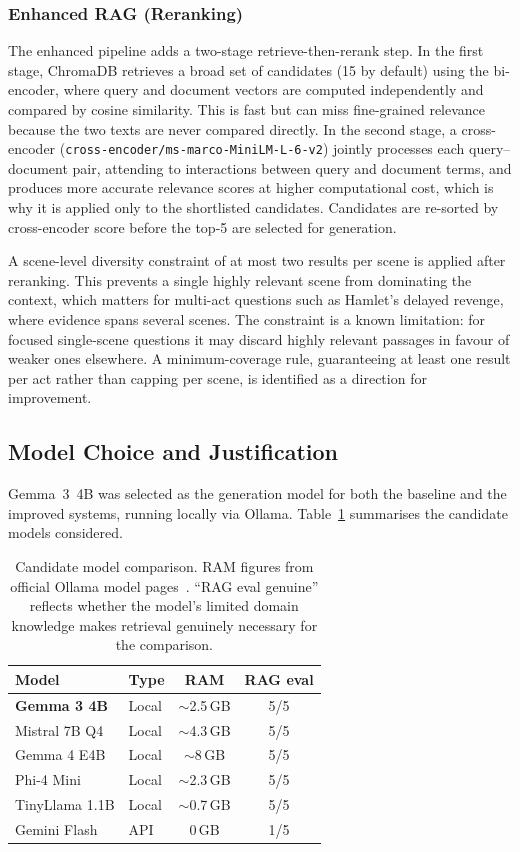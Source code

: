 \subsubsection{Enhanced RAG (Reranking)}
The enhanced pipeline adds a two-stage retrieve-then-rerank step. In the
first stage, ChromaDB retrieves a broad set of candidates (15 by default)
using the bi-encoder, where query and document vectors are computed
independently and compared by cosine similarity. This is fast but can
miss fine-grained relevance because the two texts are never compared
directly. In the second stage, a cross-encoder
(\texttt{cross-encoder/ms-marco-MiniLM-L-6-v2}) jointly processes each
query--document pair, attending to interactions between query and
document terms, and produces more accurate relevance scores at higher
computational cost, which is why it is applied only to the shortlisted
candidates. Candidates are re-sorted by cross-encoder score before the
top-5 are selected for generation.

A scene-level diversity constraint of at most two results per scene is
applied after reranking. This prevents a single highly relevant scene
from dominating the context, which matters for multi-act questions such
as Hamlet's delayed revenge, where evidence spans several scenes. The
constraint is a known limitation: for focused single-scene questions it
may discard highly relevant passages in favour of weaker ones elsewhere.
A minimum-coverage rule, guaranteeing at least one result per act rather
than capping per scene, is identified as a direction for improvement.

\subsection{Model Choice and Justification}
Gemma~3~4B was selected as the generation model for both the baseline and
the improved systems, running locally via Ollama.
Table~\ref{tab:model_comparison} summarises the candidate models
considered.

\begin{table}[ht]
\centering
\caption{Candidate model comparison. RAM figures from official Ollama
model pages~\cite{ollama_gemma3,localaimaster_ram}. ``RAG eval genuine''
reflects whether the model's limited domain knowledge makes retrieval
genuinely necessary for the comparison.}
\label{tab:model_comparison}
\begin{tabular}{llcc}
\toprule
\textbf{Model} & \textbf{Type} & \textbf{RAM} & \textbf{RAG eval} \\
\midrule
\textbf{Gemma 3 4B} & Local & $\sim$2.5\,GB & 5/5 \\
Mistral 7B Q4       & Local & $\sim$4.3\,GB & 5/5 \\
Gemma 4 E4B         & Local & $\sim$8\,GB    & 5/5 \\
Phi-4 Mini          & Local & $\sim$2.3\,GB & 5/5 \\
TinyLlama 1.1B      & Local & $\sim$0.7\,GB & 5/5 \\
Gemini Flash        & API   & 0\,GB         & 1/5 \\
\bottomrule
\end{tabular}
\end{table}

